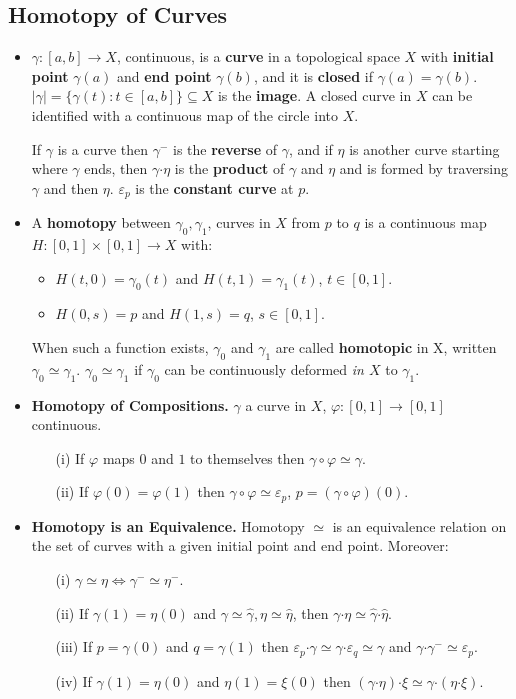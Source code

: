 \documentclass{article}
\newenvironment{topic}[1]{%
{\subsection{#1}}%
\begin{itemize}%
}{%
\end{itemize}%
}
\newcommand{\theorem}[1]{\item {\bf #1.}}
\newcommand{\lemma}[1]{\item {\bf #1.}}
\newcommand{\term}[1]{{\bf #1}}
\newcommand{\remark}{\item}
\newcommand{\curveproduct}{\boldsymbol{\cdot}}
\begin{document}
\begin{topic}{Homotopy of Curves}

\remark $\gamma : [a, b] \to X$, continuous, is a \term{curve} in a topological space $X$ with \term{initial point} $\gamma(a)$ and \term{end point} $\gamma(b)$, and it is \term{closed} if $\gamma(a) = \gamma(b)$. $|\gamma| = \{ \gamma(t) : t \in [a, b] \} \subseteq X$ is the \term{image}. A closed curve in $X$ can be identified with a continuous map of the circle into $X$.

If $\gamma$ is a curve then $\gamma^-$ is the \term{reverse} of $\gamma$, and if $\eta$ is another curve starting where $\gamma$ ends, then $\gamma \curveproduct \eta$ is the \term{product} of $\gamma$ and $\eta$ and is formed by traversing $\gamma$ and then $\eta$. $\varepsilon_p$ is the \term{constant curve} at $p$.

\remark A \term{homotopy} between $\gamma_0, \gamma_1$, curves in $X$ from $p$ to $q$ is a continuous map $H : [0, 1] \times [0, 1] \to X$ with:
\begin{itemize}
\item $H(t, 0) = \gamma_0(t)$ and $H(t, 1) = \gamma_1(t)$, $t \in [0, 1]$.
\item $H(0, s) = p$ and $H(1, s) = q$, $s \in [0, 1]$.
\end{itemize}
When such a function exists, $\gamma_0$ and $\gamma_1$ are called \term{homotopic} in X, written $\gamma_0 \simeq \gamma_1$. $\gamma_0 \simeq \gamma_1$ if $\gamma_0$ can be continuously deformed {\em in $X$} to $\gamma_1$.

\lemma{Homotopy of Compositions} $\gamma$ a curve in $X$, $\varphi : [0, 1] \to [0, 1]$ continuous.
\begin{enumerate}
\item[(i)] If $\varphi$ maps $0$ and $1$ to themselves then $\gamma \circ \varphi \simeq \gamma$.
\item[(ii)] If $\varphi(0) = \varphi(1)$ then $\gamma \circ \varphi \simeq \varepsilon_p$, $p = (\gamma \circ \varphi)(0)$.
\end{enumerate}

\theorem{Homotopy is an Equivalence} Homotopy $\simeq$ is an equivalence relation on the set of curves with a given initial point and end point. Moreover:
\begin{enumerate}
\item[(i)] $\gamma \simeq \eta \iff \gamma^- \simeq \eta^-$.
\item[(ii)] If $\gamma(1) = \eta(0)$ and $\gamma \simeq \hat\gamma, \eta \simeq \hat\eta$, then $\gamma \curveproduct \eta \simeq \hat\gamma \curveproduct \hat\eta$.
\item[(iii)] If $p = \gamma(0)$ and $q = \gamma(1)$ then $\varepsilon_p \curveproduct \gamma \simeq \gamma \curveproduct \varepsilon_q \simeq \gamma$ and $\gamma \curveproduct \gamma^- \simeq \varepsilon_p$.
\item[(iv)] If $\gamma(1) = \eta(0)$ and $\eta(1) = \xi(0)$ then $(\gamma \curveproduct \eta) \curveproduct \xi \simeq \gamma \curveproduct (\eta \curveproduct \xi)$.
\end{enumerate}


\end{topic}
\end{document}
